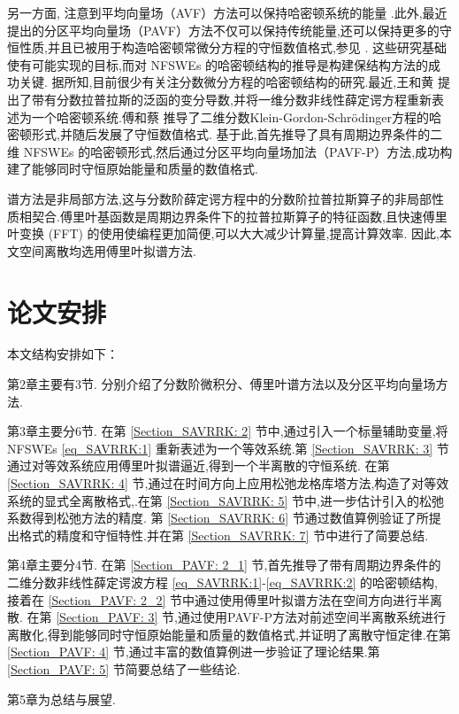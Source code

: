 另一方面,
注意到平均向量场（AVF）方法可以保持哈密顿系统的能量 \cite{buddGeometricIntegrationUsing1999,quispelNewClassEnergypreserving2008}.此外,最近提出的分区平均向量场（PAVF）方法不仅可以保持传统能量,还可以保持更多的守恒性质,并且已被用于构造哈密顿常微分方程的守恒数值格式,参见 \cite{caiPartitionedAveragedVector2018}.
这些研究基础使有可能实现的目标,而对 NFSWEs 的哈密顿结构的推导是构建保结构方法的成功关键.
据所知,目前很少有关注分数微分方程的哈密顿结构的研究.最近,王和黄 \cite{wangStructurepreservingNumericalMethods2018} 提出了带有分数拉普拉斯的泛函的变分导数,并将一维分数非线性薛定谔方程重新表述为一个哈密顿系统.傅和蔡 \cite{fuStructurepreservingAlgorithmsTwodimensional2020} 推导了二维分数Klein-Gordon-Schr{\"o}dinger方程的哈密顿形式,并随后发展了守恒数值格式.
基于此,首先推导了具有周期边界条件的二维 NFSWEs 的哈密顿形式,然后通过分区平均向量场加法（PAVF-P）方法,成功构建了能够同时守恒原始能量和质量的数值格式.

谱方法是非局部方法,这与分数阶薛定谔方程中的分数阶拉普拉斯算子的非局部性质相契合.傅里叶基函数是周期边界条件下的拉普拉斯算子的特征函数,且快速傅里叶变换 (FFT) 的使用使编程更加简便,可以大大减少计算量,提高计算效率.
因此,本文空间离散均选用傅里叶拟谱方法.

\section{论文安排}
本文结构安排如下：

第2章主要有3节. 分别介绍了分数阶微积分、傅里叶谱方法以及分区平均向量场方法.

第3章主要分6节. 在第 \ref{Section_SAVRRK: 2} 节中,通过引入一个标量辅助变量,将NFSWEs \eqref{eq_SAVRRK:1} 重新表述为一个等效系统.第 \ref{Section_SAVRRK: 3} 节通过对等效系统应用傅里叶拟谱逼近,得到一个半离散的守恒系统.
在第 \ref{Section_SAVRRK: 4} 节,通过在时间方向上应用松弛龙格库塔方法,构造了对等效系统的显式全离散格式,.在第 \ref{Section_SAVRRK: 5} 节中,进一步估计引入的松弛系数得到松弛方法的精度.
第 \ref{Section_SAVRRK: 6} 节通过数值算例验证了所提出格式的精度和守恒特性.并在第 \ref{Section_SAVRRK: 7} 节中进行了简要总结.

第4章主要分4节. 在第 \ref{Section_PAVF: 2_1} 节,首先推导了带有周期边界条件的二维分数非线性薛定谔波方程 \eqref{eq_SAVRRK:1}-\eqref{eq_SAVRRK:2} 的哈密顿结构, 接着在 \ref{Section_PAVF: 2_2} 节中通过使用傅里叶拟谱方法在空间方向进行半离散.
在第 \ref{Section_PAVF: 3} 节,通过使用PAVF-P方法对前述空间半离散系统进行离散化,得到能够同时守恒原始能量和质量的数值格式,并证明了离散守恒定律.在第 \ref{Section_PAVF: 4} 节,通过丰富的数值算例进一步验证了理论结果.第 \ref{Section_PAVF: 5} 节简要总结了一些结论.

第5章为总结与展望.